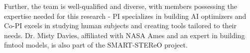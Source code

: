 Further, the team is well-qualified and diverse, with members possessing the expertise needed for this research -  PI specializes in building AI optimizers and Co-PI excels in studying human subjects and creating tools tailored to their needs. Dr. Misty Davies, affiliated with NASA Ames and an expert in building fmtool models, is also part of the SMART-STEReO project. 








 



 


	
	
	
